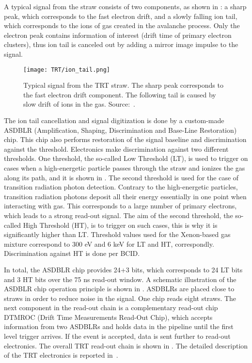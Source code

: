 A typical signal from the straw consists of two components, as shown in : 
a sharp peak, which corresponds to the fast electron drift, and a slowly falling ion tail, which corresponds to the ions of gas created in the avalanche process.
Only the electron peak contains information of interest (drift time of primary electron clusters), thus ion tail is canceled out by adding a mirror image impulse to the signal.

\begin{figure}
\centering
\texttt{[image: TRT/ion\_tail.png]}
\caption{ 
 Typical signal from the TRT straw. The sharp peak corresponds to the fast electron drift component.
 The following tail is caused by slow drift of ions in the gas.
 Source:~\cite{ID_TDR_vol2}.
}
\label{fig:ion_tail}
\end{figure}

The ion tail cancellation and signal digitization is done by a custom-made ASDBLR (Amplification, Shaping, Discrimination and Base-Line Restoration) chip. 
This chip also performs restoration of the signal baseline and discrimination against the threshold. 
Electronics make discrimination against two different thresholds. One threshold, the so-called Low Threshold (LT), 
is used to trigger on cases when a high-energetic particle passes through the straw and ionizes the gas along its path, and it is shown in .
The second threshold is used for the case of transition radiation photon detection.
Contrary to the high-energetic particles, transition radiation photons deposit all their energy essentially in one point when interacting with gas.
This corresponds to a large number of primary electrons, which leads to a strong read-out signal.
The aim of the second threshold, the so-called High Threshold (HT), is to trigger on such cases, this is why it is significantly higher than LT.
Threshold values used for the Xenon-based gas mixture correspond to 300 eV and 6 keV for LT and HT, correspondly.
Discrimination against HT is done per BCID. 

In total, the ASDBLR chip provides 24+3 bits, which corresponds to 24 LT bits and 3 HT bits over the 75 ns read-out window.
A schematic illustration of the ASDBLR chip operation principle is shown in .
ASDBLRs are placed close to straws in order to reduce noise in the signal. One chip reads eight straws.
The next component in the read-out chain is a complementary read-out chip DTMROC (Drift Time Measurements Read-Out Chip), which accepts 
information from two ASDBLRs and holds data in the pipeline until the first level trigger arrives. If the event is accepted, data is sent further to read-out electronics.
The overall TRT read-out chain is shown in . The detailed description of the TRT electronics is reported in~\cite{TRT_electronics}.

